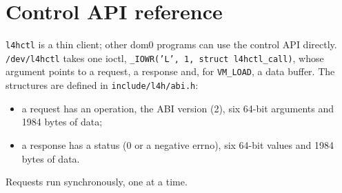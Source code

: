 \documentclass[11pt,a4paper]{report}
\newcommand{\cmd}[1]{\texttt{#1}}
\newcommand{\file}[1]{\texttt{#1}}
\begin{document}
\chapter{Control API reference}

\cmd{l4hctl} is a thin client; other dom0 programs can use the control API
directly. \file{/dev/l4hctl} takes one ioctl, \texttt{\_IOWR('L', 1, struct
l4hctl\_call)}, whose argument points to a request, a response and, for
\texttt{VM\_LOAD}, a data buffer. The structures are defined in
\file{include/l4h/abi.h}:
\begin{itemize}
  \item a request has an operation, the ABI version (2), six 64-bit
        arguments and 1984 bytes of data;
  \item a response has a status (0 or a negative errno), six 64-bit values
        and 1984 bytes of data.
\end{itemize}
Requests run synchronously, one at a time.
\end{document}
